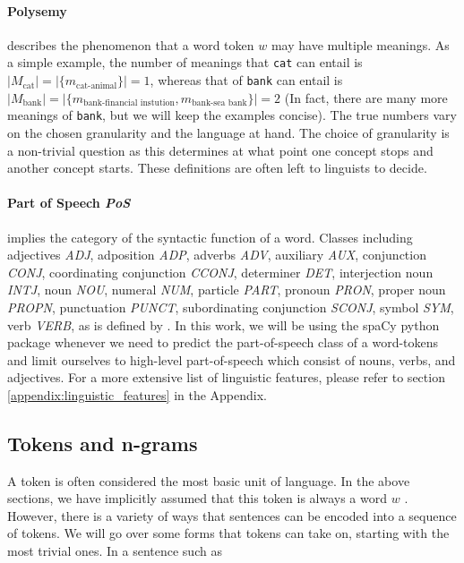 \documentclass[a4paper,12pt,oneside,openright]{report}
\begin{document}
\paragraph{Polysemy} describes the phenomenon that a word token $w$ may have multiple meanings.
As a simple example, the number of meanings that \Verb#cat# can entail is $ | M_\text{cat} | = | \{ m_\text{cat-animal} \} |  = 1$, whereas that of \Verb#bank# can entail is $ | M_\text{bank} | = | \{ m_\text{bank-financial instution},  m_\text{bank-sea bank}\} |  = 2$ (In fact, there are many more meanings of \texttt{bank}, but we will keep the examples concise).
The true numbers vary on the chosen granularity and the language at hand. 
The choice of granularity is a non-trivial question as this determines at what point one concept stops and another concept starts.
These definitions are often left to linguists to decide. \\

\paragraph{Part of Speech \textit{PoS}} implies the category of the syntactic function of a word.
Classes including adjectives \textit{ADJ}, adposition \textit{ADP}, adverbs \textit{ADV}, auxiliary \textit{AUX}, conjunction \textit{CONJ}, coordinating conjunction \textit{CCONJ}, determiner \textit{DET}, interjection noun \textit{INTJ}, noun \textit{NOU}, numeral \textit{NUM}, particle \textit{PART}, pronoun \textit{PRON}, proper noun \textit{PROPN}, punctuation \textit{PUNCT}, subordinating conjunction \textit{SCONJ}, symbol \textit{SYM}, verb \textit{VERB}, as is defined by \cite{spacyb}.
In this work, we will be using the spaCy python package  \cite{spacy} whenever we need to predict the part-of-speech class of a word-tokens and limit ourselves to high-level part-of-speech which consist of nouns, verbs, and adjectives.
For a more extensive list of linguistic features, please refer to section \ref{appendix:linguistic_features} in the Appendix.


\subsection{Tokens and n-grams}

A token is often considered the most basic unit of language.
In the above sections, we have implicitly assumed that this token is always a word $w$ . 
However, there is a variety of ways that sentences can be encoded into a sequence of tokens.
We will go over some forms that tokens can take on, starting with the most trivial ones.
In a sentence such as
\end{document}
